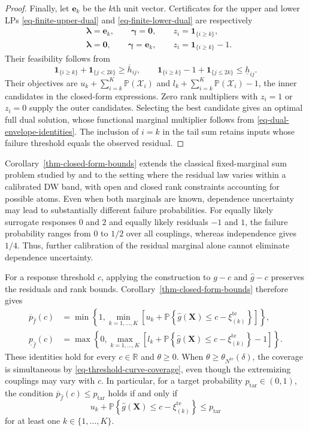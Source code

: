 \documentclass[review,11pt,3p,authoryear,nopreprintline]{elsarticle}
\begin{document}
\begin{proof}
  Finally, let $\bm e_k$ be the $k$th unit vector. Certificates for the upper and lower LPs \eqref{eq-finite-upper-dual} and \eqref{eq-finite-lower-dual} are respectively
  \begin{align*}
    &\bm\lambda=\bm e_k,\qquad\bm\gamma=\bm0,\qquad
      z_i=\mathbf1_{\{i\ge k\}},\\
    &\bm\lambda=\bm0,\qquad\bm\gamma=\bm e_k,\qquad
      z_i=\mathbf1_{\{i\ge k\}}-1.
  \end{align*}
  Their feasibility follows from
  \[
    \mathbf1_{\{i\ge k\}}+\mathbf1_{\{j<2k\}}\ge\overline h_{ij},
    \qquad
    \mathbf1_{\{i\ge k\}}-1+\mathbf1_{\{j\le2k\}}\le\underline h_{ij}.
  \]
  Their objectives are $u_k+\sum_{i=k}^{K}\mathbb P(\mathcal X_i)$ and $l_k+\sum_{i=k}^{K}\mathbb P(\mathcal X_i)-1$, the inner candidates in the closed-form expressions. Zero rank multipliers with $z_i=1$ or $z_i=0$ supply the outer candidates. Selecting the best candidate gives an optimal full dual solution, whose functional marginal multiplier follows from \eqref{eq-dual-envelope-identities}. The inclusion of $i=k$ in the tail sum retains inputs whose failure threshold equals the observed residual.
\end{proof}

Corollary~\ref{thm-closed-form-bounds} extends the classical fixed-marginal sum problem studied by \citet{M82} and \citet{F.N.S87} to the setting where the residual law varies within a calibrated DW band, with open and closed rank constraints accounting for possible atoms. Even when both marginals are known, dependence uncertainty may lead to substantially different failure probabilities. For equally likely surrogate responses $0$ and $2$ and equally likely residuals $-1$ and $1$, the failure probability ranges from $0$ to $1/2$ over all couplings, whereas independence gives $1/4$. Thus, further calibration of the residual marginal alone cannot eliminate dependence uncertainty.

For a response threshold $c$, applying the construction to $g-c$ and $\hat g-c$ preserves the residuals and rank bounds. Corollary~\ref{thm-closed-form-bounds} therefore gives
\begin{align}
  \overline p_{\hat f}(c)
    &=\min\left\{1,\min_{k=1,\ldots,K}\left[u_k
      +\mathbb P\left\{\hat g(\bm X)\le
      c-\xi_{(k)}^{\mathrm{te}}\right\}\right]\right\},
    \label{eq-threshold-closed-upper}\\
  \underline p_{\hat f}(c)
    &=\max\left\{0,\max_{k=1,\ldots,K}\left[l_k
      +\mathbb P\left\{\hat g(\bm X)\le
      c-\xi_{(k)}^{\mathrm{te}}\right\}-1\right]\right\}.
    \label{eq-threshold-closed-lower}
\end{align}
These identities hold for every $c\in\mathbb R$ and $\theta\ge0$. When $\theta\ge\theta_{N^{\mathrm{te}}}(\delta)$, the coverage is simultaneous by \eqref{eq-threshold-curve-coverage}, even though the extremizing couplings may vary with $c$. In particular, for a target probability $p_{\mathrm{tar}}\in(0,1)$, the condition $\overline p_{\hat f}(c)\le p_{\mathrm{tar}}$ holds if and only if
\[
  u_k+\mathbb P\left\{\hat g(\bm X)\le
  c-\xi_{(k)}^{\mathrm{te}}\right\}
  \le p_{\mathrm{tar}}
\]
for at least one $k\in\{1,\ldots,K\}$. 
\end{document}

